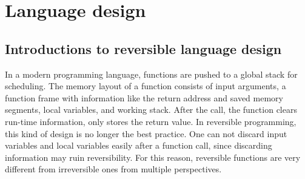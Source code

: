 \documentclass[aps,twocolumn,longbibliography,english,superscriptaddress]{revtex4-1}
\newcommand{\<}{\langle}
\renewcommand{\>}{\rangle}
\theoremstyle{definition}\newtheorem{definition}{\textit{Definition}}
\begin{document}
\section{Language design}\label{sec:lang}

    \subsection{Introductions to reversible language design}
    In a modern programming language, functions are pushed to a global stack for scheduling. The memory layout of a function consists of input arguments, a function frame with information like the return address and saved memory segments, local variables, and working stack. After the call, the function clears run-time information, only stores the return value. In reversible programming, this kind of design is no longer the best practice. One can not discard input variables and local variables easily after a function call, since discarding information may ruin reversibility. For this reason, reversible functions are very different from irreversible ones from multiple perspectives.
\end{document}
